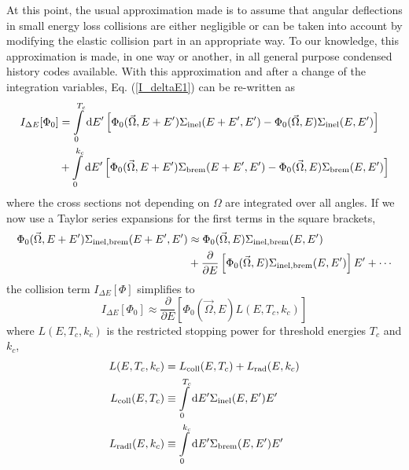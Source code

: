 At this point, the usual approximation made is to assume
that angular deflections in small energy loss collisions are
either negligible
or can be taken into account by modifying the
elastic collision part in an appropriate way. To our knowledge,
this approximation is made, in one way or another, in all
general purpose condensed history codes available.
With this approximation and after a change of the integration variables,
Eq. (\ref{I_deltaE1}) can be re-written as
\begin{equation}
\begin{split}
\label{I_deltaE2}
I_{\Delta E}[\Phi_0] & =
\int\limits_0^{T_c} {\rm d}E' \left[ \Phi_0(\vec{\Omega},E+E')
\Sigma_{\rm inel}(E+E',E') - \Phi_0(\vec{\Omega},E) \Sigma_{\rm inel}(E,E')
\right] \\
& +
\int\limits_0^{k_c} {\rm d}E'  \left[ \Phi_0(\vec{\Omega},E+E')
\Sigma_{\rm brem}(E+E',E') - \Phi_0(\vec{\Omega},E) \Sigma_{\rm brem}(E,E')
\right]
\end{split}
\end{equation}
where the cross sections not depending on $\Omega$ are integrated
over all angles.
If we now use a Taylor series expansions for the first terms in
the square brackets,
\begin{equation}
\label{taylor_exp}
\begin{split}
\Phi_0(\vec{\Omega},E+E') \Sigma_{\rm inel,brem}(E+E',E') & \approx
\Phi_0(\vec{\Omega},E) \Sigma_{\rm inel,brem}(E,E') \\
& +
\frac{\partial}{\partial E} \left[
\Phi_0(\vec{\Omega},E) \Sigma_{\rm inel,brem}(E,E') \right] E' + \cdots
\end{split}
\end{equation}
the collision term $I_{\Delta E}[\Phi]$ simplifies to
\begin{equation}
I_{\Delta E}[\Phi_0] \approx \frac{\partial}{\partial E} \left[
\Phi_0(\vec{\Omega},E) L(E,T_c,k_c) \right]
\end{equation}
where $L(E,T_c,k_c)$ is the restricted stopping power
for threshold energies $T_c$ and $k_c$,
\begin{equation}
\begin{split}
L(E,T_c,k_c) & = L_{\rm coll}(E,T_c) + L_{\rm rad}(E,k_c)  \\
L_{\rm coll}(E,T_c) & \equiv \int\limits_0^{T_c} {\rm d}E'
\Sigma_{\rm inel}(E,E') E' \\
L_{\rm radl}(E,k_c) & \equiv \int\limits_0^{k_c} {\rm d}E'
\Sigma_{\rm brem}(E,E') E'
\end{split}
\end{equation}

